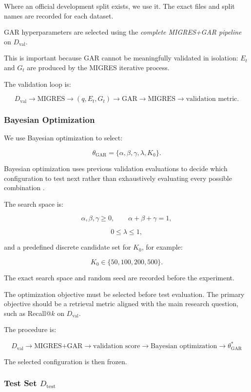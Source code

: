 \documentclass[11pt,a4paper]{article}
\begin{document}
Where an official development split exists, we use it. The exact files and split names are recorded for each dataset.

GAR hyperparameters are selected using the \emph{complete MIGRES+GAR pipeline} on $D_{\mathrm{val}}$.

This is important because GAR cannot be meaningfully validated in isolation: $E_t$ and $G_t$ are produced by the MIGRES iterative process.

The validation loop is:

\[
D_{\mathrm{val}}
\rightarrow
\text{MIGRES}
\rightarrow
(q,E_t,G_t)
\rightarrow
\text{GAR}
\rightarrow
\text{MIGRES}
\rightarrow
\text{validation metric}.
\]

\subsubsection{Bayesian Optimization}

We use Bayesian optimization to select:

\[
\theta_{\mathrm{GAR}}
=
\{\alpha,\beta,\gamma,\lambda,K_0\}.
\]

Bayesian optimization uses previous validation evaluations to decide which configuration to test next rather than exhaustively evaluating every possible combination \citep{snoek2012practical}.

The search space is:

\[
\alpha,\beta,\gamma\geq0,
\qquad
\alpha+\beta+\gamma=1,
\]

\[
0\leq\lambda\leq1,
\]

and a predefined discrete candidate set for $K_0$, for example:

\[
K_0\in\{50,100,200,500\}.
\]

The exact search space and random seed are recorded before the experiment.

The optimization objective must be selected before test evaluation. The primary objective should be a retrieval metric aligned with the main research question, such as Recall@$k$ on $D_{\mathrm{val}}$.

The procedure is:

\[
\boxed{
D_{\mathrm{val}}
\rightarrow
\text{MIGRES+GAR}
\rightarrow
\text{validation score}
\rightarrow
\text{Bayesian optimization}
\rightarrow
\theta^*_{\mathrm{GAR}}
}
\]

The selected configuration is then frozen.

\subsubsection{Test Set $D_{\mathrm{test}}$}
\end{document}
